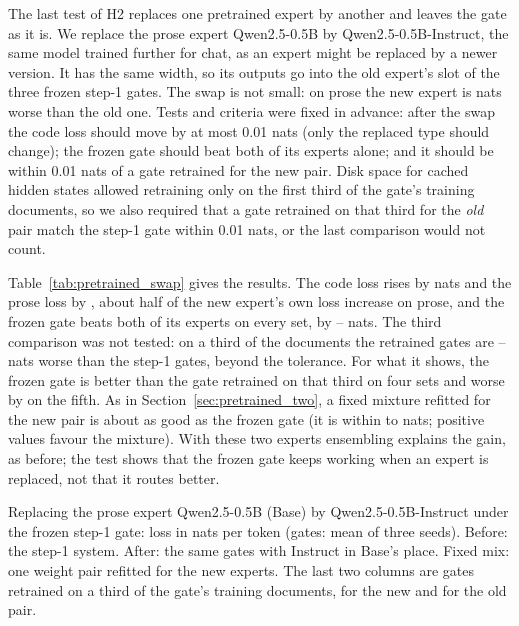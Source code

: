 \documentclass[10pt]{article}
\newcommand{\pending}[1]{{\color{red}\textbf{[#1]}}}
\begin{document}
The last test of H2 replaces one pretrained expert by another and leaves the gate as it is. We
replace the prose expert Qwen2.5-0.5B by Qwen2.5-0.5B-Instruct, the same model trained further
for chat, as an expert might be replaced by a newer version. It has the same width, so its
outputs go into the old expert's slot of the three frozen step-1 gates. The swap is not small:
on prose the new expert is \resTrackBSwapProseExpertGap{} nats worse than the old one. Tests
and criteria were fixed in advance: after the swap the code loss should move by at most 0.01
nats (only the replaced type should change); the frozen gate should beat both of its experts
alone; and it should be within 0.01 nats of a gate retrained for the new pair. Disk space for
cached hidden states allowed retraining only on the first third of the gate's training
documents, so we also required that a gate retrained on that third for the \emph{old} pair
match the step-1 gate within 0.01 nats, or the last comparison would not count.

Table~\ref{tab:pretrained_swap} gives the results. The code loss rises by
\resTrackBSwapCodeChange{} nats and the prose loss by \resTrackBSwapProseChange{}, about half
of the new expert's own loss increase on prose, and the frozen gate beats both of its experts on every
set, by \resTrackBSwapOverExpertMin--\resTrackBSwapOverExpertMax{} nats. The third comparison
was not tested: on a third of the documents the retrained gates are
\resTrackBSwapCheckMin--\resTrackBSwapCheckMax{} nats worse than the step-1 gates, beyond the
tolerance. For what it shows, the frozen gate is better than the gate retrained on that third
on four sets and worse by \resTrackBSwapVsRefWorse{} on the fifth. As in
Section~\ref{sec:pretrained_two}, a fixed mixture refitted for the new pair is about as good
as the frozen gate (it is within \resTrackBSwapConstGapMin{} to \resTrackBSwapConstGapMax{}
nats; positive values favour the mixture). With these two experts ensembling explains the
gain, as before; the test shows that the frozen gate keeps working when an expert is
replaced, not that it routes better.
\begin{table}[t]
\centering\small
\caption{Replacing the prose expert Qwen2.5-0.5B (Base) by Qwen2.5-0.5B-Instruct under the
frozen step-1 gate: loss in nats per token (gates: mean of three seeds). Before: the step-1
system. After: the same gates with Instruct in Base's place. Fixed mix: one weight pair refitted
for the new experts. The last two columns are gates retrained on a third of the gate's training
documents, for the new and for the old pair.}
\label{tab:pretrained_swap}
{\setlength{\tabcolsep}{4pt}\IfFileExists{tables/track_b_swap.tex}{}{\pending{table}}}
\end{table}
\end{document}

